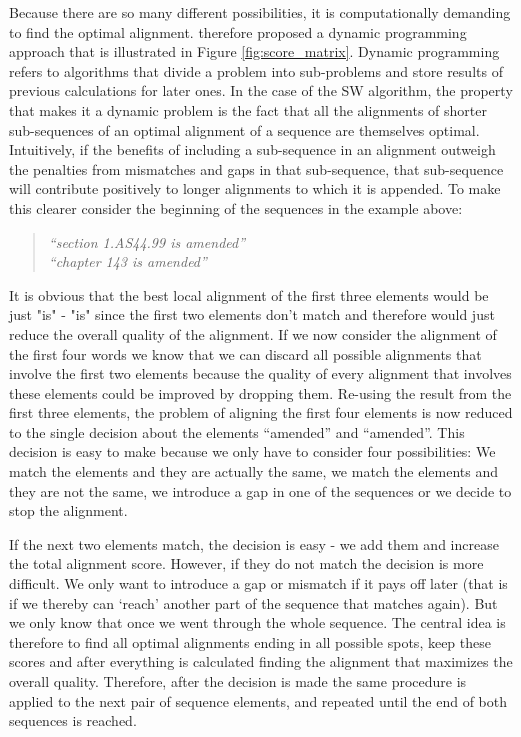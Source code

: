 \documentclass[12pt]{article} %
\begin{document}
Because there are so many different possibilities, it is computationally demanding to find the optimal alignment. \citet{smith1981identification} therefore proposed a dynamic programming approach that is illustrated in Figure \ref{fig:score_matrix}. Dynamic programming refers to algorithms that divide a problem into sub-problems and store results of previous calculations for later ones. In the case of the SW algorithm, the property that makes it a dynamic problem is the fact that all the alignments of shorter sub-sequences of an optimal alignment of a sequence are themselves optimal. Intuitively, if the benefits of including a sub-sequence in an alignment outweigh the penalties from mismatches and gaps in that sub-sequence, that sub-sequence will contribute positively to longer alignments to which it is appended. To make this clearer consider the beginning of the sequences in the example above:

\begin{quote}
\textit{``section 1.AS44.99 is amended''}\\
\textit{``chapter 143 is amended''}
\end{quote}

It is obvious that the best local alignment of the first three elements would be just "is" - "is" since the first two elements don't match and therefore would just reduce the overall quality of the alignment. If we now consider the alignment of the first four words we know that we can discard all possible alignments that involve the first two elements because the quality of every alignment that involves these elements could be improved by dropping them. Re-using the result from the first three elements, the problem of aligning the first four elements is now reduced to the single decision about the elements ``amended'' and ``amended''. This decision is easy to make because we only have to consider four possibilities: We match the elements and they are actually the same, we match the elements and they are not the same, we introduce a gap in one of the sequences or we decide to stop the alignment. 

If the next two elements match, the decision is easy - we add them and increase the total alignment score. However, if they do not match the decision is more difficult. We only want to introduce a gap or mismatch if it pays off later (that is if we thereby can `reach' another part of the sequence that matches again). But we only know that once we went through the whole sequence. The central idea is therefore to find all optimal alignments ending in all possible spots, keep these scores and after everything is calculated finding the alignment that maximizes the overall quality. Therefore, after the decision is made the same procedure is applied to the next pair of sequence elements, and repeated until the end of both sequences is reached.
\end{document}
